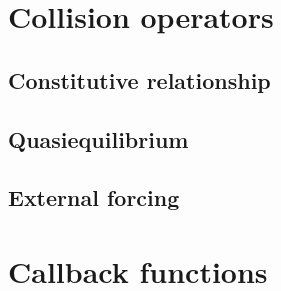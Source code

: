 \documentclass[pdf]{beamer}
\begin{document}
\section{Collision operators}

\subsection{Constitutive relationship}
\subsection{Quasiequilibrium}
\subsection{External forcing}
\section{Callback functions}
\end{document}

